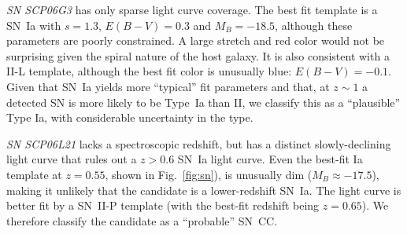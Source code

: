 {\it SN SCP06G3} has only sparse light curve coverage. The best fit
template is a SN~Ia with $s=1.3$, $E(B-V)=0.3$ and $M_B=-18.5$, although
these parameters are poorly constrained. A large stretch and red
color would not be surprising given the spiral nature of the host
galaxy. It is also consistent with a II-L template, although the best
fit color is unusually blue: $E(B-V)=-0.1$. Given that SN~Ia yields
more ``typical'' fit parameters and that, at $z \sim 1$ a detected SN
is more likely to be Type~Ia than II, we classify this as a
``plausible'' Type Ia, with considerable uncertainty in the type.





{\it SN SCP06L21} lacks a spectroscopic redshift, but has a distinct
slowly-declining light curve that rules out a $z>0.6$ SN~Ia light
curve. Even the best-fit Ia template at $z=0.55$, shown
in Fig.~\ref{fig:sn}), is unusually dim ($M_B \approx -17.5$), making it
unlikely that the candidate is a lower-redshift SN~Ia. The light curve
is better fit by a SN~II-P template (with the best-fit redshift being
$z=0.65$). We therefore classify the candidate as a ``probable''
SN~CC.

